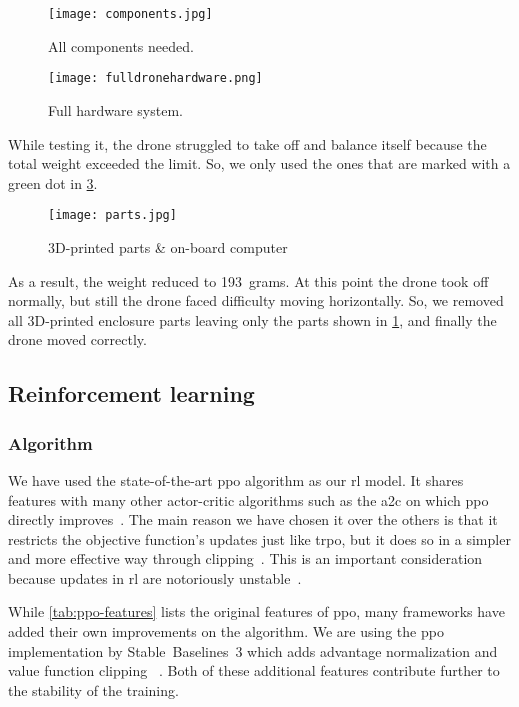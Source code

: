 \documentclass[../main.tex]{subfiles}
\begin{document}
\begin{figure}[tbp]
	\centering
	\texttt{[image: components.jpg]}
	\caption{All components needed.}
	\label{fig:components}
\end{figure}

\begin{figure}[tbp]
	\centering
	\texttt{[image: fulldronehardware.png]}
	\caption{Full hardware system.}
	\label{fig:full-hardware}
\end{figure}  

While testing it, the drone struggled to take off and balance itself
because the total weight exceeded the limit. So, we
only used the ones that are marked with a green dot in
\cref{fig:printed-parts}. 

\begin{figure}[tbp]
	\centering
	\texttt{[image: parts.jpg]}
	\caption{3D-printed parts \& on-board computer}
	\label{fig:printed-parts}
\end{figure} 

As a result, the weight reduced to \SI{193}{grams}. 
At this point the drone took off normally, but still the drone faced
difficulty moving horizontally. 
So, we removed all 3D-printed enclosure parts leaving only the parts shown in
\cref{fig:components}, and finally the drone moved correctly.
 
\subsection{Reinforcement learning}

\subsubsection{Algorithm}

We have used the state-of-the-art \gls{ppo} algorithm as our \gls{rl}
model. 
It shares features with many other actor-critic algorithms such
as the \gls{a2c} on which \gls{ppo} directly improves~\cite{ppo}.
The main reason we have chosen it over the others is that it restricts
the objective function's updates just like \gls{trpo}, but it does so
in a simpler and more effective way through clipping~\cite{ppo}.
This is an important consideration because updates in \gls{rl} are
notoriously unstable~\cite{Hen18}. 

While \cref{tab:ppo-features} lists the original features of \gls{ppo},
many frameworks have added their own improvements on the algorithm.
We are using the \gls{ppo} implementation by Stable~Baselines~3
which adds advantage normalization and value function clipping%
~\cite{sb3}.
Both of these additional features contribute further to the stability
of the training.
\end{document}
